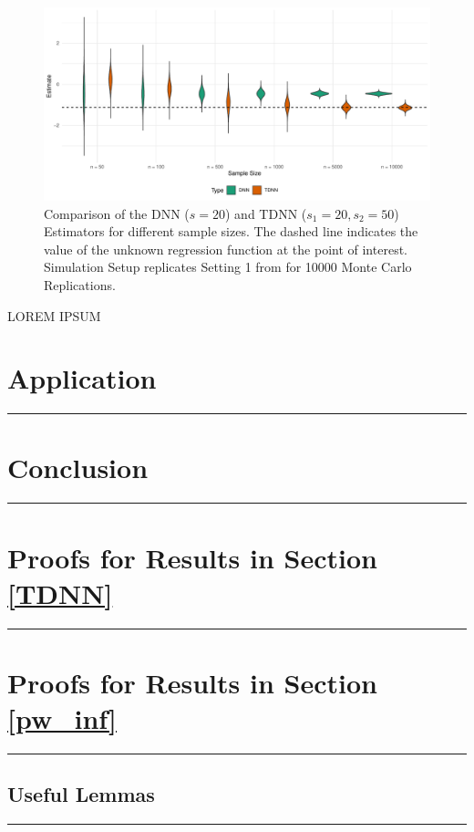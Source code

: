 \documentclass[letterpaper,10pt]{article}
\numberwithin{equation}{section}
\numberwithin{thm}{section}
\numberwithin{lem}{section}
\numberwithin{cor}{section}
\newcommand{\1}{\mathbbm{1}}
\begin{document}
\begin{figure}[H]
	\includegraphics[width = \textwidth]{../Code/Simulations/Graphics/TDNN_DNN.pdf}
	\caption{Comparison of the DNN ($s = 20$) and TDNN ($s_1 = 20, s_2 = 50$) Estimators for different sample sizes.
		The dashed line indicates the value of the unknown regression function at the point of interest.
		Simulation Setup replicates Setting 1 from \citet{demirkaya_optimal_2024} for 10000 Monte Carlo Replications.}
\end{figure}

{\color{red} LOREM IPSUM}


\section{Application}\label{Application}
\hrule

\section{Conclusion}\label{Conclusion}
\hrule

\newpage
\printbibliography

\appendix

\section{Proofs for Results in Section \ref{TDNN}}
\hrule


\section{Proofs for Results in Section \ref{pw_inf}}
\hrule

\subsection{Useful Lemmas}
\hrule
\end{document}
